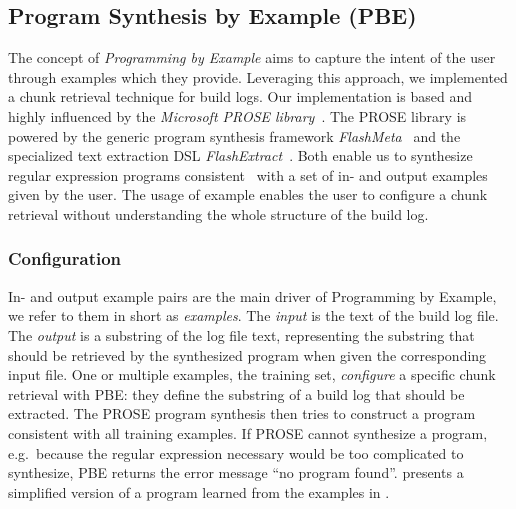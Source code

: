 \subsection{Program Synthesis by Example (PBE)}
\label{sec:expl-pbe}
The concept of \emph{Programming by Example} aims to capture the
intent of the user through examples which they provide.
Leveraging this approach, we implemented a chunk retrieval technique
for build logs.
Our implementation is based and highly influenced by the
\emph{Microsoft PROSE library}~\cite{prose2019webpage}.
The PROSE library is powered by the generic program synthesis framework
\emph{FlashMeta}~\cite{polozov2015flashmeta:} and the specialized
text extraction DSL \emph{FlashExtract}~\cite{le2014flashextract:}.
Both enable us to synthesize regular expression programs
consistent~\cite{mitchell1982generalization} with a set of in-
and output examples given by the user.
The usage of example enables the user to configure a chunk
retrieval without understanding the whole structure of
the build log.

\subsubsection{Configuration}
In- and output example pairs are the main driver of Programming by
Example, we refer to them in short as \emph{examples}.
The \emph{input} is the text of the build log file.
The \emph{output} is
a substring of the log file text, representing the
substring that should be retrieved by the synthesized program when
given the corresponding input file.
One or multiple examples, the
training set, \emph{configure} a specific chunk retrieval with PBE:
they define the substring of a build log that should be extracted.
The PROSE program synthesis then tries to construct a program
consistent with all training examples.
If PROSE cannot synthesize a program, e.g.\
because the regular expression
necessary would be too complicated to synthesize, PBE returns the
error message ``no program found''.
 presents a simplified version
of a program learned from the examples in \Cref{lst:chunk-example}.


